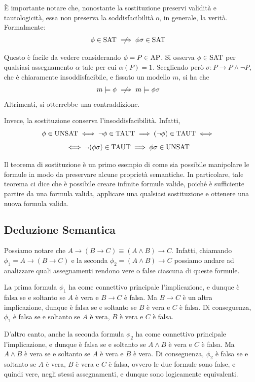 \begin{observation}{}
  È importante notare che, nonostante la sostituzione preservi validità e tautologicità, essa non preserva la soddisfacibilità o, in generale, la verità.
  Formalmente:
  \[\phi \in \Sat \centernot\implies \phi\sigma \in \Sat\]

  Questo è facile da vedere considerando \(\phi = P \in \AP\). Si osserva \(\phi \in \Sat\) per qualsiasi assegnamento \(\alpha\) tale per cui \(\alpha(P)=1\).
  Scegliendo però \(\sigma : P \to P\land \neg P\), che è chiaramente insoddisfacibile, e fissato un modello \(m\), si ha che
  \[m\models\phi \centernot\implies m\models\phi\sigma\]
  Altrimenti, si otterrebbe una contraddizione.

  Invece, la sostituzione conserva l'insoddisfacibilità. Infatti,
  \[\phi \in \Unsat \iff \neg \phi \in \Taut \implies (\neg\phi)\in \Taut\iff \]
  \[\iff \neg(\phi\sigma) \in \Taut \implies \phi\sigma \in \Unsat\]
\end{observation}

Il teorema di sostituzione è un primo esempio di come sia possibile manipolare le formule in modo da preservare alcune proprietà semantiche. 
In particolare, tale teorema ci dice che è possibile creare infinite formule valide, poiché è sufficiente partire da una formula valida, applicare una qualsiasi sostituzione e ottenere una nuova formula valida.

\subsection{Deduzione Semantica}

Possiamo notare che \(A \to (B\to C)\equiv (A\land B)\to C\).
Infatti, chiamando \(\phi_1 = A \to (B\to C)\) e la seconda \(\phi_2 = (A\land B)\to C\) possiamo andare ad analizzare quali assegnamenti rendono vere o false ciascuna di queste formule.

La prima formula \(\phi_1\) ha come connettivo principale l'implicazione, e dunque è falsa se e soltanto se \(A\) è vera e \(B\to C\) è falsa. Ma \(B\to C\) è un altra implicazione, dunque è falsa se e soltanto se \(B\) è vera e \(C\) è falsa. Di conseguenza, \(\phi_1\) è falsa se e soltanto se \(A\) è vera, \(B\) è vera e \(C\) è falsa.

D'altro canto, anche la seconda formula \(\phi_2\) ha come connettivo principale l'implicazione, e dunque è falsa se e soltanto se \(A\land B\) è vera e \(C\) è falsa. Ma \(A\land B\) è vera se e soltanto se \(A\) è vera e \(B\) è vera. Di conseguenza, \(\phi_2\) è falsa se e soltanto se \(A\) è vera, \(B\) è vera e \(C\) è falsa, ovvero le due formule sono false, e quindi vere, negli stessi assegnamenti, e dunque sono logicamente equivalenti.

